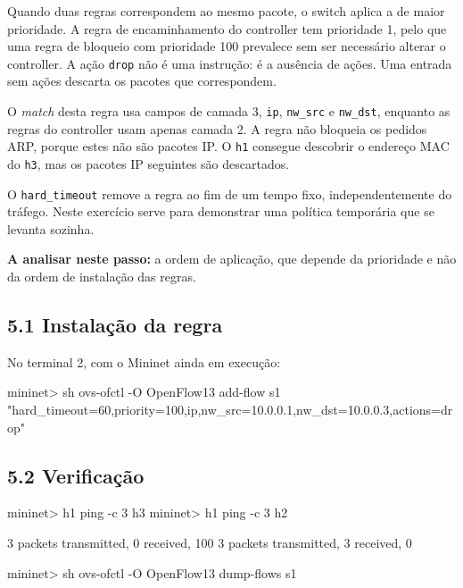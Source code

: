 \documentclass[11pt,a4paper]{article}
\newcommand{\cmd}[1]{\texttt{#1}}
\begin{document}
\begin{teoria}
Quando duas regras correspondem ao mesmo pacote, o switch aplica a de maior prioridade. A regra de encaminhamento do controller tem prioridade 1, pelo que uma regra de bloqueio com prioridade 100 prevalece sem ser necessário alterar o controller. A ação \cmd{drop} não é uma instrução: é a ausência de ações. Uma entrada sem ações descarta os pacotes que correspondem.

O \emph{match} desta regra usa campos de camada 3, \cmd{ip}, \cmd{nw\_src} e \cmd{nw\_dst}, enquanto as regras do controller usam apenas camada 2. A regra não bloqueia os pedidos ARP, porque estes não são pacotes IP. O \cmd{h1} consegue descobrir o endereço MAC do \cmd{h3}, mas os pacotes IP seguintes são descartados.

O \cmd{hard\_timeout} remove a regra ao fim de um tempo fixo, independentemente do tráfego. Neste exercício serve para demonstrar uma política temporária que se levanta sozinha.

\textbf{A analisar neste passo:} a ordem de aplicação, que depende da prioridade e não da ordem de instalação das regras.
\end{teoria}

\subsection*{5.1 Instalação da regra}

No terminal 2, com o Mininet ainda em execução:

\begin{terminal}
mininet> sh ovs-ofctl -O OpenFlow13 add-flow s1 "hard_timeout=60,priority=100,ip,nw_src=10.0.0.1,nw_dst=10.0.0.3,actions=drop"
\end{terminal}

\subsection*{5.2 Verificação}

\begin{terminal}
mininet> h1 ping -c 3 h3
mininet> h1 ping -c 3 h2
\end{terminal}

\begin{saida}
3 packets transmitted, 0 received, 100%
3 packets transmitted, 3 received, 0%
\end{saida}

\begin{terminal}
mininet> sh ovs-ofctl -O OpenFlow13 dump-flows s1
\end{terminal}
\end{document}
